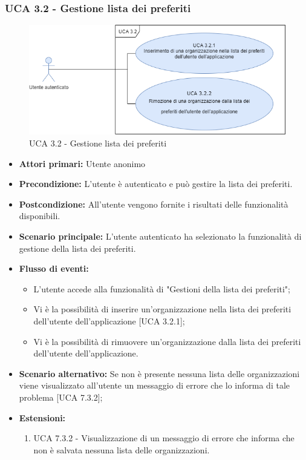 \subsubsection{UCA 3.2 - Gestione lista dei preferiti}%
\begin{figure}[h]
	\centering
	
	\includegraphics[scale=0.5]{sezioni/UseCase/Immagini/UCA3.2.png}
	\caption{UCA 3.2 - Gestione lista dei preferiti}
\end{figure}
\begin{itemize}
	\item \textbf{Attori primari:} Utente anonimo
	\item \textbf{Precondizione:} L'utente è autenticato e può gestire la lista dei preferiti.
	\item \textbf{Postcondizione:} All'utente vengono fornite i risultati delle funzionalità disponibili.
	\item \textbf{Scenario principale:} L'utente autenticato ha selezionato la funzionalità di gestione della lista dei preferiti.
	\item \textbf{Flusso di eventi:}
			\begin{itemize}
			\item L'utente accede alla funzionalità di "Gestioni della lista dei preferiti";
			\item Vi è la possibilità di inserire un'organizzazione nella lista dei preferiti dell'utente dell'applicazione [UCA 3.2.1];
			\item Vi è la possibilità di rimuovere un'organizzazione dalla lista dei preferiti dell'utente dell'applicazione.
			\end{itemize}
	\item \textbf{Scenario alternativo:} Se non è presente nessuna lista delle organizzazioni viene visualizzato all'utente un messaggio di errore che lo informa di tale problema [UCA 7.3.2];
	\item \textbf{Estensioni:}
	\begin{enumerate}
		\item UCA 7.3.2 - Visualizzazione di un messaggio di errore che informa che non è salvata nessuna lista delle organizzazioni.
	\end{enumerate}
\end{itemize}

